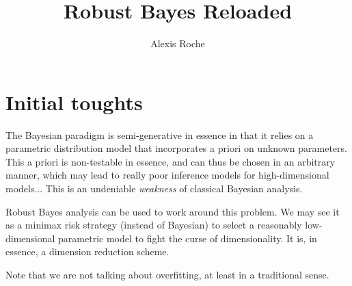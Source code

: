 \documentclass{article}
\title{Robust Bayes Reloaded}
\author{Alexis Roche}
\begin{document}
\maketitle

\section{Initial toughts}

The Bayesian paradigm is semi-generative in essence in that it relies on a parametric distribution model that incorporates a priori on unknown parameters. This a priori is non-testable in essence, and can thus be chosen in an arbitrary manner, which may lead to really poor inference models for high-dimensional models... This is an undeniable {\em weakness} of classical Bayesian analysis.

Robust Bayes analysis can be used to work around this problem. We may see it as a minimax risk strategy (instead of Bayesian) to select a reasonably low-dimensional parametric model to fight the curse of dimensionality. It is, in essence, a dimension reduction scheme.

Note that we are not talking about overfitting, at least in a traditional sense. 






\end{document}
